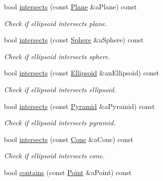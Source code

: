 \begin{DoxyCompactItemize}
bool \hyperlink{classlibrary_1_1math_1_1geom_1_1d3_1_1objects_1_1_ellipsoid_ada79a3cf3bf68843a8313eb914c21a95}{intersects} (const \hyperlink{classlibrary_1_1math_1_1geom_1_1d3_1_1objects_1_1_plane}{Plane} \&a\+Plane) const
\begin{DoxyCompactList}\small\item\em Check if ellipsoid intersects plane. \end{DoxyCompactList}\item 
bool \hyperlink{classlibrary_1_1math_1_1geom_1_1d3_1_1objects_1_1_ellipsoid_aa9d3833e3d2be95ff00d7af32fe9b15e}{intersects} (const \hyperlink{classlibrary_1_1math_1_1geom_1_1d3_1_1objects_1_1_sphere}{Sphere} \&a\+Sphere) const
\begin{DoxyCompactList}\small\item\em Check if ellipsoid intersects sphere. \end{DoxyCompactList}\item 
bool \hyperlink{classlibrary_1_1math_1_1geom_1_1d3_1_1objects_1_1_ellipsoid_a4dfd1a3feba0ebed8a5adf89120ce53c}{intersects} (const \hyperlink{classlibrary_1_1math_1_1geom_1_1d3_1_1objects_1_1_ellipsoid}{Ellipsoid} \&an\+Ellipsoid) const
\begin{DoxyCompactList}\small\item\em Check if ellipsoid intersects ellipsoid. \end{DoxyCompactList}\item 
bool \hyperlink{classlibrary_1_1math_1_1geom_1_1d3_1_1objects_1_1_ellipsoid_a05dc13a49a72cb23046ff5735072765b}{intersects} (const \hyperlink{classlibrary_1_1math_1_1geom_1_1d3_1_1objects_1_1_pyramid}{Pyramid} \&a\+Pyramid) const
\begin{DoxyCompactList}\small\item\em Check if ellipsoid intersects pyramid. \end{DoxyCompactList}\item 
bool \hyperlink{classlibrary_1_1math_1_1geom_1_1d3_1_1objects_1_1_ellipsoid_ab48166cd354dbcbc667a11cf6ef19593}{intersects} (const \hyperlink{classlibrary_1_1math_1_1geom_1_1d3_1_1objects_1_1_cone}{Cone} \&a\+Cone) const
\begin{DoxyCompactList}\small\item\em Check if ellipsoid intersects cone. \end{DoxyCompactList}\item 
bool \hyperlink{classlibrary_1_1math_1_1geom_1_1d3_1_1objects_1_1_ellipsoid_ae54cb74c4e6445988ac4d78e00288dd2}{contains} (const \hyperlink{classlibrary_1_1math_1_1geom_1_1d3_1_1objects_1_1_point}{Point} \&a\+Point) const

\end{DoxyCompactItemize}
